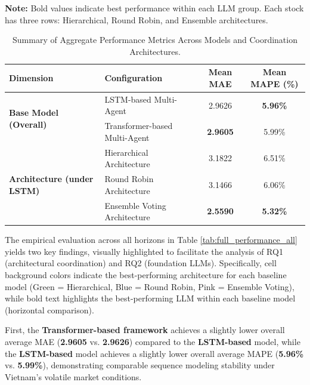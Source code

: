 \documentclass{ieeeaccess}
\begin{document}
{\vspace{0.3cm}
\footnotesize
\textbf{Note:} Bold values indicate best performance within each LLM group. Each stock has three rows: Hierarchical, Round Robin, and Ensemble architectures.
}

\begin{table}[h!]
\centering
\caption{Summary of Aggregate Performance Metrics Across Models and Coordination Architectures.}
\label{tab:aggregate_performance_summary}
\begin{tabular}{@{}llcc@{}}
\toprule
\textbf{Dimension} & \textbf{Configuration} & \textbf{Mean MAE} & \textbf{Mean MAPE (\%)} \\ \midrule
\multirow{2}{*}{\textbf{Base Model (Overall)}} & LSTM-based Multi-Agent & 2.9626 & \textbf{5.96\%} \\
                                             & Transformer-based Multi-Agent & \textbf{2.9605} & 5.99\% \\ \midrule
\multirow{3}{*}{\textbf{Architecture (under LSTM)}} & Hierarchical Architecture & 3.1822 & 6.51\% \\
                                                      & Round Robin Architecture & 3.1466 & 6.06\% \\
                                                      & Ensemble Voting Architecture & \textbf{2.5590} & \textbf{5.32\%} \\ \bottomrule
\end{tabular}
\end{table}

The empirical evaluation across all horizons in Table \ref{tab:full_performance_all} yields two key findings, visually highlighted to facilitate the analysis of RQ1 (architectural coordination) and RQ2 (foundation LLMs). Specifically, cell background colors indicate the best-performing architecture for each baseline model (Green = Hierarchical, Blue = Round Robin, Pink = Ensemble Voting), while bold text highlights the best-performing LLM within each baseline model (horizontal comparison).

First, the \textbf{Transformer-based framework} achieves a slightly lower overall average MAE (\textbf{2.9605} vs. \textbf{2.9626}) compared to the \textbf{LSTM-based} model, while the \textbf{LSTM-based} model achieves a slightly lower overall average MAPE (\textbf{5.96\%} vs. \textbf{5.99\%}), demonstrating comparable sequence modeling stability under Vietnam's volatile market conditions.
\end{document}

